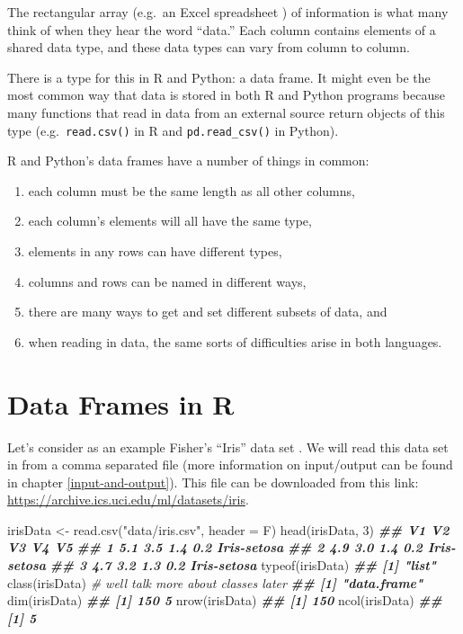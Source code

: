 \documentclass[
  12pt,
  krantz2]{krantz}
\makeatletter
\newenvironment{Shaded}{\begin{snugshade}}{\end{snugshade}}
\newcommand{\AttributeTok}[1]{\textcolor[rgb]{0.61,0.61,0.61}{#1}}
\newcommand{\CommentTok}[1]{\textcolor[rgb]{0.37,0.37,0.37}{\textit{#1}}}
\newcommand{\DecValTok}[1]{\textcolor[rgb]{0.06,0.06,0.06}{#1}}
\newcommand{\DocumentationTok}[1]{\textcolor[rgb]{0.37,0.37,0.37}{\textbf{\textit{#1}}}}
\newcommand{\FunctionTok}[1]{\textcolor[rgb]{0,0,0}{#1}}
\newcommand{\NormalTok}[1]{#1}
\newcommand{\OtherTok}[1]{\textcolor[rgb]{0.37,0.37,0.37}{#1}}
\newcommand{\StringTok}[1]{\textcolor[rgb]{0.5,0.5,0.5}{#1}}
\providecommand{\tightlist}{%
  \setlength{\itemsep}{0pt}\setlength{\parskip}{0pt}}
\newenvironment{kframe}{%
\medskip{}
\setlength{\fboxsep}{.8em}
 \def\at@end@of@kframe{}%
 \ifinner\ifhmode%
  \def\at@end@of@kframe{\end{minipage}}%
  \begin{minipage}{\columnwidth}%
 \fi\fi%
 \def\FrameCommand##1{\hskip\@totalleftmargin \hskip-\fboxsep
 \colorbox{shadecolor}{##1}\hskip-\fboxsep
     \hskip-\linewidth \hskip-\@totalleftmargin \hskip\columnwidth}%
 \MakeFramed {\advance\hsize-\width
   \@totalleftmargin\z@ \linewidth\hsize
   \@setminipage}}%
 {\par\unskip\endMakeFramed%
 \at@end@of@kframe}
\renewenvironment{Shaded}{\begin{kframe}}{\end{kframe}}
\makeatother
\begin{document}
The rectangular array (e.g.~an Excel spreadsheet ) of information is what many think of when they hear the word ``data.'' Each column contains elements of a shared data type, and these data types can vary from column to column.

There is a type for this in R and Python: a data frame. It might even be the most common way that data is stored in both R and Python programs because many functions that read in data from an external source return objects of this type (e.g.~\texttt{read.csv()} in R and \texttt{pd.read\_csv()} in Python).

R and Python's data frames have a number of things in common:

\begin{enumerate}
\def\labelenumi{\arabic{enumi}.}
\tightlist
\item
  each column must be the same length as all other columns,
\item
  each column's elements will all have the same type,
\item
  elements in any rows can have different types,
\item
  columns and rows can be named in different ways,
\item
  there are many ways to get and set different subsets of data, and
\item
  when reading in data, the same sorts of difficulties arise in both languages.
\end{enumerate}

\hypertarget{data-frames-in-r}{%
\section{Data Frames in R}\label{data-frames-in-r}}

Let's consider as an example Fisher's ``Iris'' data set \citep{misc_iris_53}. We will read this data set in from a comma separated file (more information on input/output can be found in chapter \ref{input-and-output}). This file can be downloaded from this link: \url{https://archive.ics.uci.edu/ml/datasets/iris}.

\begin{Shaded}
\begin{Highlighting}[]
\NormalTok{irisData }\OtherTok{\textless{}{-}} \FunctionTok{read.csv}\NormalTok{(}\StringTok{"data/iris.csv"}\NormalTok{, }\AttributeTok{header =}\NormalTok{ F)}
\FunctionTok{head}\NormalTok{(irisData, }\DecValTok{3}\NormalTok{)}
\DocumentationTok{\#\#    V1  V2  V3  V4          V5}
\DocumentationTok{\#\# 1 5.1 3.5 1.4 0.2 Iris{-}setosa}
\DocumentationTok{\#\# 2 4.9 3.0 1.4 0.2 Iris{-}setosa}
\DocumentationTok{\#\# 3 4.7 3.2 1.3 0.2 Iris{-}setosa}
\FunctionTok{typeof}\NormalTok{(irisData)}
\DocumentationTok{\#\# [1] "list"}
\FunctionTok{class}\NormalTok{(irisData) }\CommentTok{\# we\textquotesingle{}ll talk more about classes later}
\DocumentationTok{\#\# [1] "data.frame"}
\FunctionTok{dim}\NormalTok{(irisData)}
\DocumentationTok{\#\# [1] 150   5}
\FunctionTok{nrow}\NormalTok{(irisData)}
\DocumentationTok{\#\# [1] 150}
\FunctionTok{ncol}\NormalTok{(irisData)}
\DocumentationTok{\#\# [1] 5}
\end{Highlighting}
\end{Shaded}
\end{document}
